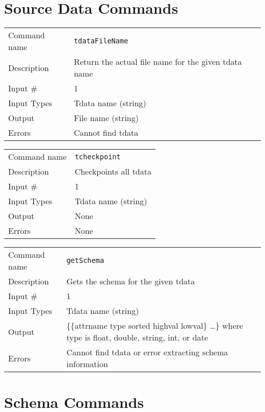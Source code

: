 \section{Source Data Commands}

\noindent
\begin{tabular}{l|p{5in}}
\hline
Command name & {\tt tdataFileName} \\
Description  & Return the actual file name for the given tdata name \\
Input \#     & 1 \\
Input Types  & Tdata name (string) \\
Output       & File name (string) \\
Errors       & Cannot find tdata \\
\hline
\end{tabular}

\bigskip

\noindent
\begin{tabular}{l|p{5in}}
\hline
Command name & {\tt tcheckpoint} \\
Description  & Checkpoints all tdata \\
Input \#     & 1 \\
Input Types  & Tdata name (string) \\
Output       & None \\
Errors       & None \\
\hline
\end{tabular}

\bigskip

\noindent
\begin{tabular}{l|p{5in}}
\hline
Command name & {\tt getSchema} \\
Description  & Gets the schema for the given tdata \\
Input \#     & 1 \\
Input Types  & Tdata name (string) \\
Output       & \{\{attrname type sorted highval lowval\} \ldots \}
               where type is float, double, string, int, or date \\
Errors       & Cannot find tdata or error extracting schema information \\
\hline
\end{tabular}

\section{Schema Commands}

